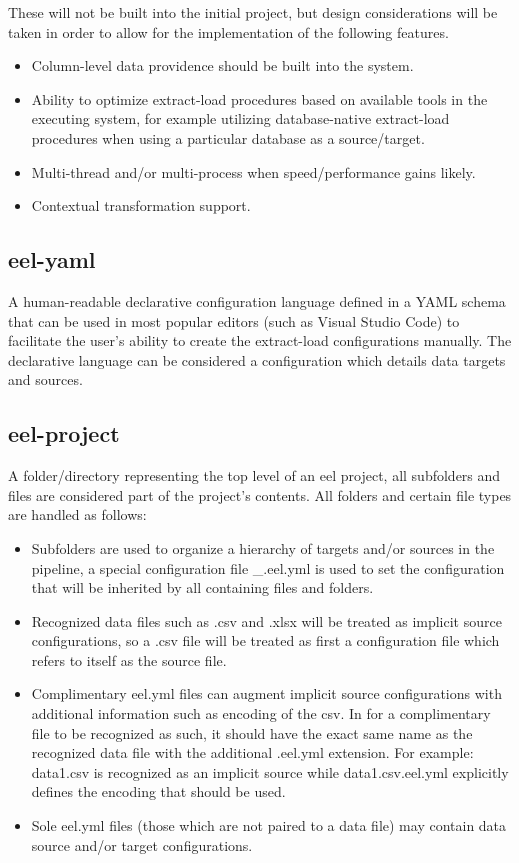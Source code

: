 These will not be built into the initial project, but design
considerations will be taken in order to allow for the implementation of
the following features.

\begin{itemize}
\item
  Column-level data providence should be built into the system.
\item
  Ability to optimize extract-load procedures based on available tools
  in the executing system, for example utilizing database-native
  extract-load procedures when using a particular database as a
  source/target.
\item
  Multi-thread and/or multi-process when speed/performance gains likely.
\item
  Contextual transformation support.
\end{itemize}

\subsection{eel-yaml}\label{eel-yaml}

A human-readable declarative configuration language defined in a YAML
schema that can be used in most popular editors (such as Visual Studio
Code) to facilitate the user's ability to create the extract-load
configurations manually. The declarative language can be considered a
configuration which details data targets and sources.

\subsection{eel-project}\label{eel-project}

A folder/directory representing the top level of an eel project, all
subfolders and files are considered part of the project's contents. All
folders and certain file types are handled as follows:

\begin{itemize}
\item
  Subfolders are used to organize a hierarchy of targets and/or sources
  in the pipeline, a special configuration file \_.eel.yml is used to
  set the configuration that will be inherited by all containing files
  and folders.
\item
  Recognized data files such as .csv and .xlsx will be treated as
  implicit source configurations, so a .csv file will be treated as
  first a configuration file which refers to itself as the source file.
\item
  Complimentary eel.yml files can augment implicit source configurations
  with additional information such as encoding of the csv. In for a
  complimentary file to be recognized as such, it should have the exact
  same name as the recognized data file with the additional .eel.yml
  extension. For example: data1.csv is recognized as an implicit source
  while data1.csv.eel.yml explicitly defines the encoding that should be
  used.
\item
  Sole eel.yml files (those which are not paired to a data file) may
  contain data source and/or target configurations.
\end{itemize}

